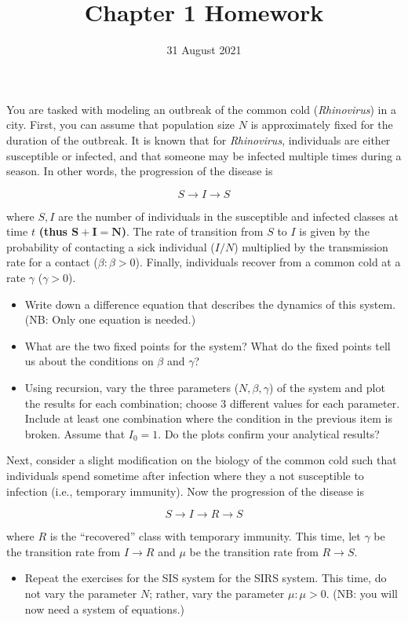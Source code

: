 \documentclass{article}
\title{Chapter 1 Homework}
\date{31 August 2021}
\begin{document}
\maketitle

You are tasked with modeling an outbreak of the common cold (\emph{Rhinovirus}) in a city. First, you can assume that population size $N$ is approximately fixed for the duration of the outbreak. It is known that for \emph{Rhinovirus}, individuals are either susceptible or infected, and that someone may be infected multiple times during a season. In other words, the progression of the disease is

\begin{equation} S \rightarrow I \rightarrow S \end{equation} 

\noindent where $S,I$ are the number of individuals in the susceptible and infected classes at time $t$ \textbf{(thus $\mathbf{S+I=N}$)}. The rate of transition from $S$ to $I$ is given by the probability of contacting a sick individual ($I/N$) multiplied by the transmission rate for a contact ($\beta : \beta > 0 $). Finally, individuals recover from a common cold at a rate $\gamma$ ($\gamma > 0$). 

\begin{itemize}
    \item Write down a difference equation that describes the dynamics of this system. (NB: Only one equation is needed.)
    \item What are the two fixed points for the system? What do the fixed points tell us about the conditions on $\beta$ and $\gamma$?
    \item Using recursion, vary the three parameters ($N,\beta,\gamma$) of the system and plot the results for each combination; choose 3 different values for each parameter. Include at least one combination where the condition in the previous item is broken. Assume that $I_0=1$. Do the plots confirm your analytical results?
\end{itemize}

Next, consider a slight modification on the biology of the common cold such that individuals spend sometime after infection where they a not susceptible to infection (i.e., temporary immunity). Now the progression of the disease is 

\begin{equation} S \rightarrow I \rightarrow R \rightarrow S \end{equation} 

\noindent where $R$ is the ``recovered'' class with temporary immunity. This time, let $\gamma$ be the transition rate from $I\rightarrow R$ and $\mu$ be the transition rate from $R \rightarrow S$.

\begin{itemize}
    \item Repeat the exercises for the SIS system for the SIRS system. This time, do not vary the parameter $N$; rather, vary the parameter $\mu: \mu > 0.$ (NB: you will now need a system of equations.)
\end{itemize}
\end{document}
